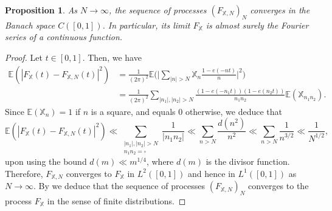 \documentclass[JEP,XML,SOM,Unicode,NoFloatCountersInSection,published]{cedram}
\theoremstyle{plain}
\newtheorem{pro}[thm]{Proposition}
\theoremstyle{definition}
\newcommand{\X}{\mathbb{X}}
\newcommand{\ex}{\mathbb{E}}
\begin{document}
\begin{pro}\label{pro: ContinuityRandom }
As $N\to \infty$, the sequence of processes $(F_{\X, N})_{N}$ converges in the Banach space $C([0, 1])$. In particular, its limit $F_{\X}$ is almost surely the Fourier series of a continuous function.
\end{pro}

\begin{proof}
Let $t\in [0, 1]$. Then, we have
\begin{align*}\ex\left(|F_{\X}(t)- F_{\X, N}(t)|^2\right)
&= \frac{1}{(2\pi)^2}\ex\Big(\Big|\sum_{|n|>N} \X_n \frac{1-e(-nt)}{n}\Big|^2\Big)\\
& = \frac{1}{(2\pi)^2}\sum_{|n_1|, |n_2|>N} \frac{(1-e(-n_1t))(1-e(n_2t))}{n_1n_2}\ex\left(\X_{n_1n_2}\right).
\end{align*}
Since $\ex(\X_n)=1$ if $n$ is a square, and equals $0$ otherwise, we deduce that
\[
\ex\left(|F_{\X}(t)- F_{\X, N}(t)|^2\right) \ll \sum_{\substack{|n_1|, |n_2|>N \\ n_1n_2=\square}} \frac{1}{|n_1n_2|}\ll \sum_{n> N} \frac{d(n^2)}{n^2} \ll \sum_{n> N} \frac{1}{n^{3/2}} \ll \frac{1}{N^{1/2}},\]
upon using the bound $d(m)\ll m^{1/4}$, where $d(m)$ is the divisor function. Therefore, $F_{\X, N}$ converges to $F_{\X}$ in $L^{2}([0, 1])$ and hence in $L^1([0, 1])$ as $N\to \infty$. By \cite[Lem.\,3]{Ko} we deduce that the sequence of processes $(F_{\X, N})_{N}$ converges to the process $F_{\X}$ in the sense of finite distributions.


\end{proof}
\end{document}
